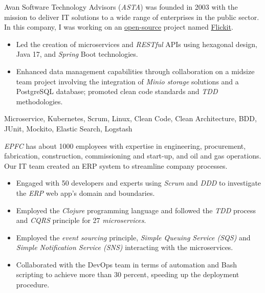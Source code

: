 \vspace*{-5pt}
\begin{experiences}
{
  Avan Software Technology Advisors (\emph{ASTA}) was founded in 2003 with the mission to deliver IT solutions to a wide range of enterprises in the public sector. In this company, I was working on an \href{https://github.com/flickit-platform/flickit-assessment}{open-source} project named \href{https://flickit.org/}{Flickit}.
  \begin{itemize}
    \item Led the creation of microservices and \emph{RESTful} APIs using hexagonal design, Java 17, and \emph{Spring} Boot technologies.
    \item Enhanced data management capabilities through collaboration on a midsize team project involving the integration of \emph{Minio storage} solutions and a PostgreSQL database; promoted clean code standards and \emph{TDD} methodologies. \end{itemize}}
  {Microservice, Kubernetes, Scrum, Linux, Clean Code, Clean Architecture, BDD, JUnit, Mockito, Elastic Search, Logstash} 
 \emptySeparator
 {
   \emph{EPFC} has about 1000 employees with expertise in engineering, procurement, fabrication, construction, commissioning and start-up, and oil and gas operations. Our IT team created an ERP system to streamline company processes.
   \begin{itemize}
   \item Engaged with 50 developers and experts using \emph{Scrum} and \emph{DDD} to investigate the \textit{ERP} web app's domain and boundaries.
   \item Employed the \emph{Clojure} programming language and followed the \emph{TDD} process and \textit{CQRS} principle for 27 \emph{microservices}.
   \item Employed the \textit{event sourcing} principle, \textit{Simple Queuing Service (SQS)} and \textit{Simple Notification Service (SNS)} interacting with the microservices.
   \item Collaborated with the DevOps team in terms of automation and Bash scripting to achieve more than 30 percent, speeding up the deployment procedure.

\end{itemize}}
\end{experiences}
